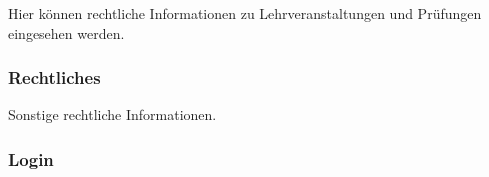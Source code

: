 \documentclass[a4paper,10pt]{scrartcl}
\begin{document}
\noindent{}
\medskip

Hier können rechtliche Informationen zu Lehrveranstaltungen und Prüfungen eingesehen werden.

\subsubsection{Rechtliches}

\noindent{}
\medskip

Sonstige rechtliche Informationen.

\subsubsection{Login}

\noindent{}
\medskip
\end{document}
